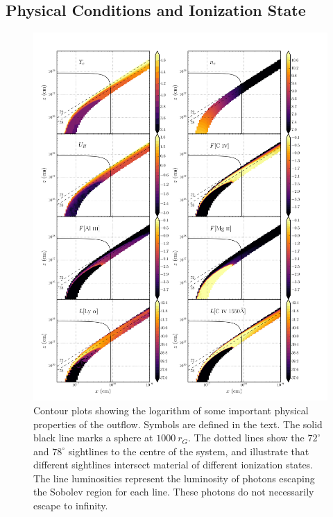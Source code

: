 \documentclass[useAMS,usenatbib]{mn2e_x}
\begin{document}
\subsection{Physical Conditions and Ionization State}


\begin{figure} %
\centering
\includegraphics[width=1.0\textwidth]{figures/link8.png}
\caption
{
Contour plots showing the logarithm of some important 
physical properties of the outflow. Symbols are defined in the text.
The solid black line marks a sphere at $1000~r_G$.
The dotted lines show the $72^\circ$ and $78^\circ$ sightlines 
to the centre of the system, and illustrate that different sightlines
intersect material of different ionization states.
The line luminosities represent the luminosity of photons
escaping the Sobolev region for each line. These photons do not
necessarily escape to infinity.
}
\label{fig:wind}
\end{figure} %
\end{document}
